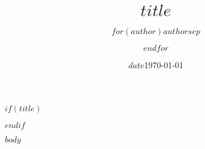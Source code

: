 \documentclass[$if(fontsize)$$fontsize$$else$11pt$endif$,$if(papersize)$$papersize$$else$letterpaper$endif$,$if(sides)$$sides$$else$oneside$endif$]{article}
\title{\vspace{-2cm}\huge\bfseries $title$}
\author{$for(author)$$author$$sep$ \and $endfor$}
\date{$date$}
\date{\today}
\begin{document}
$if(title)$
\maketitle
\thispagestyle{empty}
\vspace{1em}
$endif$

$body$
\end{document}
